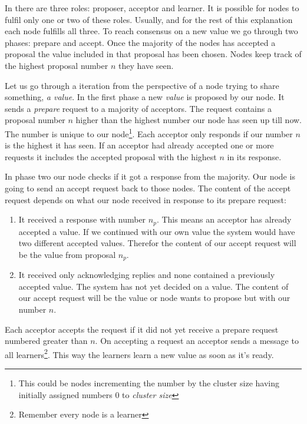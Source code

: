 In \paxos{} there are three roles: proposer, acceptor and learner. It is possible for nodes to fulfil only one or two of these roles. Usually, and for the rest of this explanation each node fulfills all three. To reach consensus on a new value we go through two phases: prepare and accept. Once the majority of the nodes has accepted a proposal the value included in that proposal has been chosen. Nodes keep track of the highest proposal number $n$ they have seen. 

Let us go through a \paxos{} iteration from the perspective of a node trying to share something, \textit{a value}. In the first phase a new \textit{value} is proposed by our node. It sends a \textit{prepare} request to a majority of acceptors. The request contains a proposal number $n$ higher than the highest number our node has seen up till now. The number is unique to our node\footnote{This could be nodes incrementing the number by the cluster size having initially assigned numbers $0$ to \textit{cluster size}}. Each acceptor only responds if our number $n$ is the highest it has seen. If an acceptor had already accepted one or more requests it includes the accepted proposal with the highest $n$ in its response.

In phase two our node checks if it got a response from the majority. Our node is going to send an accept request back to those nodes. The content of the accept request depends on what our node received in response to its prepare request:
%
\begin{enumerate}
	\item It received a response with number $n_p$. This means an acceptor has already accepted a value. If we continued with our own value the system would have two different accepted values. Therefor the content of our accept request will be the value from proposal $n_p$.
	\item It received only acknowledging replies and none contained a previously accepted value. The system has not yet decided on a value. The content of our accept request will be the value or node wants to propose but with our number $n$.
\end{enumerate}
%
Each acceptor accepts the request if it did not yet receive a prepare request numbered greater than $n$. On accepting a request an acceptor sends a message to all learners\footnote{Remember every node is a learner}. This way the learners learn a new value as soon as it's ready.


